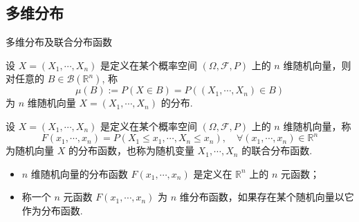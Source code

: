 \documentclass[Prob-All.tex]{subfiles}
\begin{document}
\subsection{多维分布}
\begin{frame}{多维分布及联合分布函数}
		\begin{defi}[多维分布]
		设 $X=\left (X_1,\cdots ,X_n \right) $ 是定义在某个概率空间 $\left ( \varOmega ,\mathcal{F},P   \right) $ 上的 $n$ 维随机向量，则对任意的 $B\in\mathcal{B}(\mathbb{R}^n)$, 称
		$$
		\mu(B):=P(X\in B)=P((X_1,\cdots, X_n)\in B)
		$$ 为 $n$ 维随机向量 $X=\left (X_1,\cdots ,X_n \right)$ 的分布. %
	\end{defi}

\pause

	\begin{defi}[分布函数或联合分布函数]
		设 $X=\left (X_1,\cdots ,X_n \right) $ 是定义在某个概率空间 $\left ( \varOmega ,\mathcal{F},P \right) $ 上的 $n$ 维随机向量，称
		$$
		F\left( x_1,\cdots ,x_n \right) =P\left( X_1\leqslant x_1,\cdots ,X_n\leqslant x_n \right) ,\quad \forall \left( x_1,\cdots ,x_n \right) \in \mathbb{R}^n
		$$ 为随机向量 $X$ 的分布函数，也称为随机变量 $ X_1,\cdots,X_n$ 的联合分布函数.
	\end{defi}
\pause
\begin{rmk}
\begin{itemize}[<+-|alert@+>]
	\item $n$ 维随机向量的分布函数 $F (x_1,\cdots,x_n)$ 是定义在 $\mathbb{R}^n$ 上的 $n$ 元函数；
	\item 称一个 $n$ 元函数 $F (x_1,\cdots,x_n)$ 为 $n$ 维分布函数，如果存在某个随机向量以它作为分布函数.
\end{itemize}
\end{rmk}

\end{frame}
\end{document}
